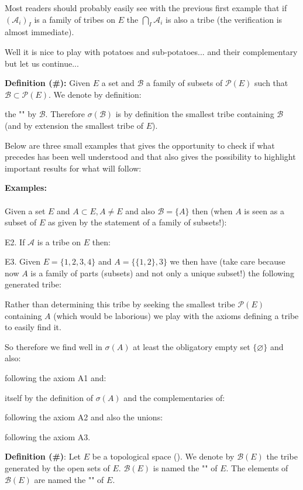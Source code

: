 	\begin{tcolorbox}[title=Remark,colframe=black,arc=10pt]
	Most readers should probably easily see with the previous first example that if $(\mathcal{A}_i)_I$ is a family of tribes on $E$ the $\bigcap_I \mathcal{A}_i$ is also a tribe (the verification is almost immediate).
	\end{tcolorbox}	
	Well it is nice to play with potatoes and sub-potatoes... and their complementary but let us continue...
	
	\textbf{Definition (\#\mydef):} Given $E$ a set and $\mathcal{B}$ a family of subsets of $\mathcal{P}(E)$ such that $\mathcal{B}\subset \mathcal{P}(E)$. We denote by definition:
	
	the "" by $\mathcal{B}$. Therefore $\sigma(\mathcal{B})$ is by definition the smallest tribe containing $\mathcal{B}$ (and by extension the smallest tribe of $E$).

	Below are three small examples that gives the opportunity to check if what precedes has been well understood and that also gives the possibility to highlight important results for what will follow:
	\begin{tcolorbox}[colframe=black,colback=white,sharp corners]
	\textbf{{\Large {}}Examples:}\\\\
	Given a set $E$ and $A\subset E,A \neq E$ and also $\mathcal{B}=\{A\}$ then (when $A$ is seen as a subset of $E$ as given by the statement of a family of subsets!):
	
	
	E2. If $\mathcal{A}$ is a tribe on $E$ then:
	

	E3. Given $E=\{1,2,3,4\}$ and $A=\{\{1,2\},{3}\}$ we then have (take care because now $A$ is a family of parts (subsets) and not only a unique subset!) the following generated tribe:
	
	Rather than determining this tribe by seeking the smallest tribe $\mathcal{P}(E)$ containing $A$ (which would be laborious) we play with the axioms defining a tribe to easily find it.
	
	So therefore we find well in $\sigma(A)$ at least the obligatory empty set $\{\varnothing\}$ and also:
	
	following the axiom A1 and:
	
	itself by the definition of $\sigma(A)$ and the complementaries of:
	
	following the axiom A2 and also the unions:
	
	following the axiom A3.
	\end{tcolorbox}
	\textbf{Definition (\#\mydef)}: Let $E$ be a topological space (). We denote by $\mathcal{B}(E)$ the tribe generated by the open sets of $E$. $\mathcal{B}(E)$ is named the "" of $E$. The elements of $\mathcal{B}(E)$ are named the "" of $E$. 
	
